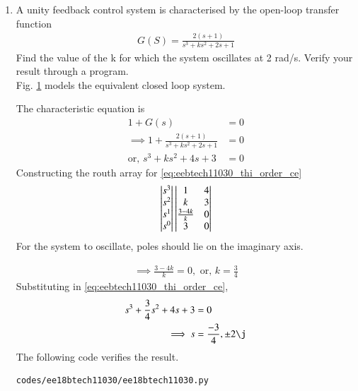 \begin{enumerate}[label=\thesubsection.\arabic*.,ref=\thesubsection.\theenumi]
\item A unity feedback control system is characterised by the open-loop transfer function
\begin{align}
G(S) = \frac{2(s+1)}{s^3 + ks^2 + 2s +1}
\end{align}
Find the value of the k for which the system oscillates at 2 rad/s.  Verify your result through a program.\\
%
\solution Fig. \ref{fig:ee18btech11030_block} models the equivalent closed loop system. 

\begin{figure}[!ht]
	\begin{center}
		
		\resizebox{\columnwidth}{!}{}
	\end{center}
\caption{}
\label{fig:ee18btech11030_block}
\end{figure}



%
The characteristic equation is
\begin{align}
1 + G(s) &= 0
\\
\implies 1 + \frac{2(s+1)}{s^3 + ks^2 + 2s +1} &= 0
\\
\text{or, } s^3+ks^2+4s+3 &= 0 
\label{eq:eebtech11030_thi_order_ce}
\end{align}
Constructing the routh array for \eqref{eq:eebtech11030_thi_order_ce}
\begin{align}
\begin{vmatrix}s^3\\s^2\\s^1 \\ s^0\end{vmatrix}
\begin{vmatrix}1 & 4 \\ k & 3 \\  \frac{3-4k}{k} & 0\\ 3 & 0\end{vmatrix} 
\end{align}
For the system to oscillate, poles should lie on the imaginary axis. 

\begin{align}
\implies \frac{3-4k}{k} = 0, \text{ or, }  k = \frac{3}{4}
\end{align}
Substituting in \eqref{eq:eebtech11030_thi_order_ce},
\begin{align} 
s^3+\frac{3}{4}s^2+4s+3 &= 0
\\
\implies  s &= \frac{-3}{4},\pm 2\j
\end{align}
%
The following code verifies the result.
\begin{lstlisting}
codes/ee18btech11030/ee18btech11030.py
\end{lstlisting}


\end{enumerate}
